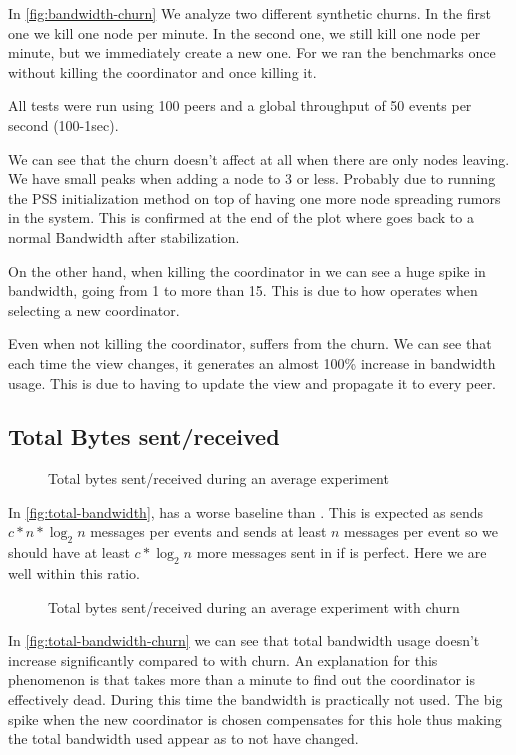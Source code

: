 In \autoref{fig:bandwidth-churn} We analyze two different synthetic churns. In the first one we kill one node per minute. In the second one, we still kill one node per minute, but we immediately create a new one. For \jgroups we ran the benchmarks once without killing the coordinator and once killing it.

All tests were run using 100 peers and a global throughput of 50 events per second (100-1sec). 

We can see that the churn doesn't affect  \epto at all when there are only nodes leaving. We have small peaks when adding a node to \SI{3}{\mbps} or less. Probably due to running the PSS initialization method on top of having one more node spreading rumors in the system. This is confirmed at the end of the plot where \epto goes back to a normal Bandwidth after stabilization.

On the other hand, when killing the coordinator in \jgroups we can see a huge spike in bandwidth, going from \SI{1}{\mbps} to more than \SI{15}{\mbps}. This is due to how \jgroups operates when selecting a new coordinator.

Even when not killing the coordinator, \jgroups suffers from the churn. We can see that each time the view changes, it generates an almost 100\% increase in bandwidth usage. This is due to \jgroups having to update the view and propagate it to every peer.

\newpage

\subsection{Total Bytes sent/received}
\begin{figure}[h]
	\centering
	
	\vspace{-2mm} 
	\caption{Total bytes sent/received during an average experiment}
	\vspace{-2mm} 
	\label{fig:total-bandwidth}
\end{figure}
In \autoref{fig:total-bandwidth}, \epto has a worse baseline than \jgroups. This is expected as \epto sends $c*n*\log_2 n$ messages per events and \jgroups sends at least $n$ messages per event so we should have at least $c*\log_2 n$ more messages sent in \epto if \jgroups is perfect. Here we are well within this ratio.

\begin{figure}[h]
	\centering
	
	\vspace{-2mm} 
	\caption{Total bytes sent/received during an average experiment with churn}
	\vspace{-2mm} 
	\label{fig:total-bandwidth-churn}
\end{figure}
In \autoref{fig:total-bandwidth-churn} we can see that \jgroups total bandwidth usage doesn't increase significantly compared to \epto with churn. An explanation for this phenomenon is that \jgroups takes more than a minute to find out the coordinator is effectively dead. During this time the bandwidth is practically not used. The big spike when the new coordinator is chosen compensates for this hole thus making the total bandwidth used appear as to not have changed.

